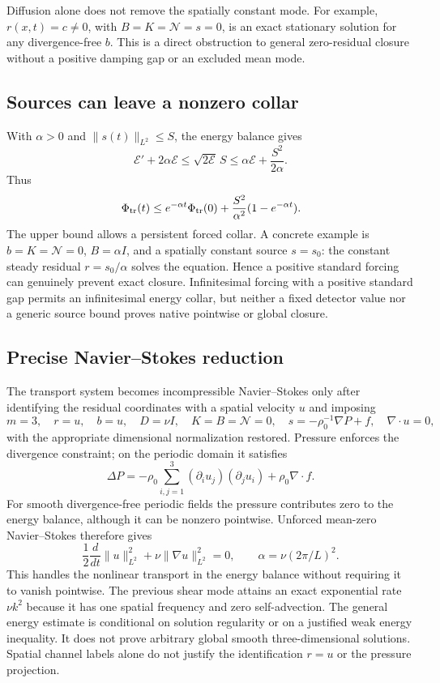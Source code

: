 \documentclass[11pt,a4paper]{article}
\begin{document}
Diffusion alone does not remove the spatially constant mode. For example,
$r(x,t)=c\ne0$, with $B=K=\mathcal N=s=0$, is an exact stationary solution
for any divergence-free $b$. This is a direct obstruction to general
zero-residual closure without a positive damping gap or an excluded mean mode.

\subsection{Sources can leave a nonzero collar}
With $\alpha>0$ and $\|s(t)\|_{L^2}\le S$, the energy balance gives
\[
\mathcal E'+2\alpha\mathcal E
\le\sqrt{2\mathcal E}\,S
\le\alpha\mathcal E+\frac{S^2}{2\alpha}.
\]
Thus
\[
\Phi_{\rm tr}(t)
\le e^{-\alpha t}\Phi_{\rm tr}(0)
+\frac{S^2}{\alpha^2}(1-e^{-\alpha t}).
\]
The upper bound allows a persistent forced collar. A concrete example is
$b=K=\mathcal N=0$, $B=\alpha I$, and a spatially constant source
$s=s_0$: the constant steady residual $r=s_0/\alpha$ solves the equation.
Hence a positive standard forcing can genuinely prevent exact closure.
Infinitesimal forcing with a positive standard gap permits an infinitesimal
energy collar, but neither a fixed detector value nor a generic source bound
proves native pointwise or global closure.

\subsection{Precise Navier--Stokes reduction}
The transport system becomes incompressible Navier--Stokes only after
identifying the residual coordinates with a spatial velocity $u$ and imposing
\[
m=3,\quad r=u,\quad b=u,\quad D=\nu I,
\quad K=B=\mathcal N=0,
\quad s=-\rho_0^{-1}\nabla P+f,
\quad \nabla\cdot u=0,
\]
with the appropriate dimensional normalization restored. Pressure enforces
the divergence constraint; on the periodic domain it satisfies
\[
\Delta P=-\rho_0\sum_{i,j=1}^3
(\partial_i u_j)(\partial_j u_i)+\rho_0\nabla\cdot f.
\]
For smooth divergence-free periodic fields the pressure contributes zero
to the energy balance, although it can be nonzero pointwise. Unforced
mean-zero Navier--Stokes therefore gives
\[
\frac12\frac{d}{dt}\|u\|_{L^2}^2
+\nu\|\nabla u\|_{L^2}^2=0,
\qquad \alpha=\nu(2\pi/L)^2.
\]
This handles the nonlinear transport in the energy balance without requiring
it to vanish pointwise. The previous shear mode attains an exact exponential
rate $\nu k^2$ because it has one spatial frequency and zero self-advection.
The general energy estimate is conditional on solution regularity or on a
justified weak energy inequality. It does not prove arbitrary global smooth
three-dimensional solutions. Spatial channel labels alone do not justify
the identification $r=u$ or the pressure projection.
\end{document}
